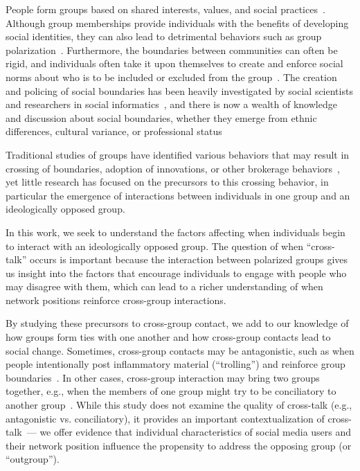 \documentclass[letterpaper]{article}
\newcommand{\apu}[1]{{\textcolor{purple}{apu: #1}}}
\begin{document}
People form groups based on shared interests, values, and social practices~\cite{gerber2010sociology}. Although group memberships provide individuals with the benefits of developing social identities, they can also lead to detrimental behaviors such as group polarization~\cite{tajfel1979individualsandgroups,tajfel1970experiments,tajfel1979integrative}. Furthermore, the boundaries between communities can often be rigid, and individuals often take it upon themselves to create and enforce social norms about who is to be included or excluded from the group~\cite{sherif1961robbers}. The creation and policing of social boundaries has been heavily investigated by social scientists and researchers in social informatics~\cite{lamont2002study}, and there is now a wealth of knowledge and discussion about social boundaries, whether they emerge from ethnic differences, cultural variance, or professional status ~\cite{abbott1988system,wimmer2008elementary,wimmer2013ethnic} 

Traditional studies of groups have identified various behaviors that may result in crossing of boundaries, adoption of innovations, or other brokerage behaviors~\cite{rogers2003diffusion,tilley2005boundsocties}, yet little research has focused on the precursors to this crossing behavior, in particular the emergence of interactions between individuals in one group and an ideologically opposed group. 

In this work, we seek to understand the factors affecting when individuals begin to interact with an ideologically opposed group. The question of when ``cross-talk'' occurs is important because the interaction between polarized groups gives us insight into the factors that encourage individuals to engage with people who may disagree with them, which can lead to a richer understanding of when network positions reinforce cross-group interactions. 

By studying these precursors to cross-group contact, we add to our knowledge of how groups form ties with one another and how cross-group contacts lead to social change. Sometimes, cross-group contacts may be antagonistic, such as when people intentionally post inflammatory material (``trolling'') and reinforce group boundaries~\cite{bergstrom2011don}. In other cases, cross-group interaction may bring two groups together, e.g., when the members of one group might try to be conciliatory to another group~\cite{cehajic2008forgiveandforget}. While this study does not examine the quality of cross-talk (e.g., antagonistic vs. conciliatory), it provides an important contextualization of cross-talk~--- we offer evidence that individual characteristics of social media users and their network position influence the propensity to address the opposing group (or ``outgroup'').
\end{document}
